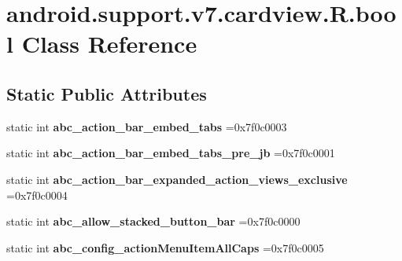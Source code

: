 \hypertarget{classandroid_1_1support_1_1v7_1_1cardview_1_1R_1_1bool}{}\section{android.\+support.\+v7.\+cardview.\+R.\+bool Class Reference}
\label{classandroid_1_1support_1_1v7_1_1cardview_1_1R_1_1bool}
\subsection*{Static Public Attributes}
\begin{DoxyCompactItemize}
\item 
\mbox{\label{classandroid_1_1support_1_1v7_1_1cardview_1_1R_1_1bool_a71176a22e69befdd00db6f5fb5d40a8c}} 
static int {\bfseries abc\+\_\+action\+\_\+bar\+\_\+embed\+\_\+tabs} =0x7f0c0003
\item 
\mbox{\label{classandroid_1_1support_1_1v7_1_1cardview_1_1R_1_1bool_a1a5161d146b46f20a89a2ad33162aa65}} 
static int {\bfseries abc\+\_\+action\+\_\+bar\+\_\+embed\+\_\+tabs\+\_\+pre\+\_\+jb} =0x7f0c0001
\item 
\mbox{\label{classandroid_1_1support_1_1v7_1_1cardview_1_1R_1_1bool_aef562bd8f17f82e60a9a61c8b426a5cb}} 
static int {\bfseries abc\+\_\+action\+\_\+bar\+\_\+expanded\+\_\+action\+\_\+views\+\_\+exclusive} =0x7f0c0004
\item 
\mbox{\label{classandroid_1_1support_1_1v7_1_1cardview_1_1R_1_1bool_ab9365f05b25871c625fffe64efa2b14b}} 
static int {\bfseries abc\+\_\+allow\+\_\+stacked\+\_\+button\+\_\+bar} =0x7f0c0000
\item 
\mbox{\label{classandroid_1_1support_1_1v7_1_1cardview_1_1R_1_1bool_a06f087d60f3393910c01bb20bc502253}} 
static int {\bfseries abc\+\_\+config\+\_\+action\+Menu\+Item\+All\+Caps} =0x7f0c0005
\item 
\mbox{\label{classandroid_1_1support_1_1v7_1_1cardview_1_1R_1_1bool_a78c0c9cca630f3fbc841cf248916a375}} 

\end{DoxyCompactItemize}
